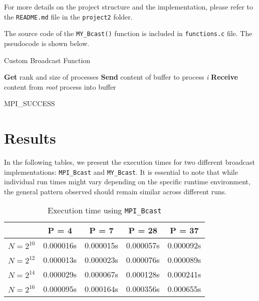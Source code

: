 \documentclass[12pt,a4paper]{article}
\begin{document}
For more details on the project structure and the implementation, please refer to the \texttt{README.md} file in the \texttt{project2} folder.

The source code of the \texttt{MY\_Bcast()} function is included in \texttt{functions.c} file. 
The pseudocode is shown below.
\begin{algorithm}
    \caption{Custom Broadcast Function}
    \begin{algorithmic}[1]
    \State \textbf{Get} rank and size of processes
                \State \textbf{Send} content of buffer to process \textit{i}
            \EndFor
        \Else
            \State \textbf{Receive} content from \textit{root} process into buffer
        \EndIf
        
        \State \Return MPI\_SUCCESS
    \EndProcedure
    \end{algorithmic}
\end{algorithm}


\section{Results}

In the following tables, 
we present the execution times for two different broadcast implementations: 
\texttt{MPI\_Bcast} and \texttt{MY\_Bcast}. 
It is essential to note that while individual run times might vary depending on the specific runtime environment, 
the general pattern observed should remain similar across different runs.

\begin{table}[!htb]
    \centering
    \begin{tabular}{|c|c|c|c|c|}
    \hline
    & P = 4 & P = 7 & P = 28 & P = 37 \\
    \hline
    $N = 2^{10}$ & 0.000016s & 0.000015s & 0.000057s & 0.000092s \\
    \hline
    $N = 2^{12}$ & 0.000013s & 0.000023s & 0.000076s & 0.000089s \\
    \hline
    $N = 2^{14}$ & 0.000029s & 0.000067s & 0.000128s & 0.000241s \\
    \hline
    $N = 2^{16}$ & 0.000095s & 0.000164s & 0.000356s & 0.000655s \\
    \hline
    \end{tabular}
    \caption{Execution time using \texttt{MPI\_Bcast}}
\end{table}
\end{document}
